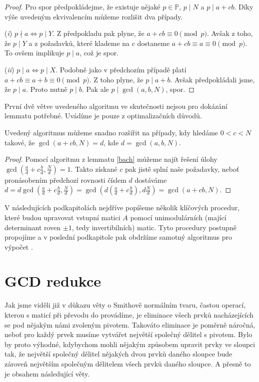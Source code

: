 \begin{proof}
Pro spor předpokládejme, že existuje nějaké $ p \in \mathbb{P}$,
$ p \mid N $ a $ p \mid a + cb $.
Díky výše uvedeným ekvivalencím můžeme rozlišit dva případy.

(\textit{i}) $ p \nmid a \Leftrightarrow p \mid Y $.
Z předpokladu pak plyne, že $ a + cb \equiv 0 \pmod{p} $. Avšak z toho, že
$ p \mid Y $ a z požadavků, které klademe na $ c $ dostaneme
$ a + cb \equiv a \equiv 0 \pmod{p} $. To ovšem implikuje  $ p \mid a $, což
je spor.

(\textit{ii}) $ p \mid a \Leftrightarrow p \mid X $.
Podobně jako v předchozím případě platí $ a + cb \equiv a + b \equiv 0 \pmod{p} $.
Z toho plyne, že $ p \mid a + b $. Avšak předpokládali jsme, že $ p \mid a $.
Proto nutně $ p \mid b $. Pak ale $ p \mid \gcd(a,b,N) $, spor.

\end{proof}
\begin{pozn}
První dvě větve uvedeného algoritmu ve skutečnosti nejsou pro dokázání lemmatu
potřebné. Uvádíme je pouze z optimalizačních důvodů.
\end{pozn}
\begin{dus}\label{Bach_Dus}
Uvedený algoritmus můžeme snadno rozšířit na případy, kdy hledáme $ 0 < c < N $
takové, že $ \gcd(a + cb,N) = d $, kde $ d = \gcd(a,b,N) $.
\end{dus}
\begin{proof}
Pomocí algoritmu z lemmatu \ref{bach} můžeme najít řešení úlohy
$ \gcd(\frac{a}{d} + c\frac{b}{d},\frac{N}{d}) = 1 $. Takto získané $ c $ pak
jistě splní naše požadavky, neboť pronásobením předchozí rovnosti číslem $ d $
dostáváme $ d = d \gcd(\frac{a}{d} + c\frac{b}{d},\frac{N}{d}) =
\gcd(d(\frac{a}{d} + c\frac{b}{d}),d\frac{N}{d}) = \gcd(a + cb,N) $.
\end{proof}

V následujících podkapitolách nejdříve popíšeme několik klíčových procedur, které
budou upravovat vstupní matici $ A $ pomocí unimodulárních (mající determinant
roven $\pm 1$, tedy invertibilních) matic.
Tyto procedury postupně propojíme a v poslední podkapitole pak obdržíme samotný
algoritmus pro výpočet \rst.





\section{GCD redukce}
Jak jsme viděli již v důkazu věty o Smithově normálním tvaru, častou operací,
kterou s maticí při převodu do \snf provádíme, je eliminace všech prvků
nacházejících se pod nějakým námi zvoleným pivotem. Takováto eliminace je poměrně
náročná, neboť pro každý prvek musíme vytvářet největší společný dělitel s pivotem.
Bylo by proto výhodné, kdybychom mohli nějakým způsobem upravit prvky ve sloupci tak,
že největší společný dělitel nějakých dvou prvků daného sloupce bude zároveň největším
společným dělitelem všech prvků daného sloupce. A přesně to je obsahem následující věty.

